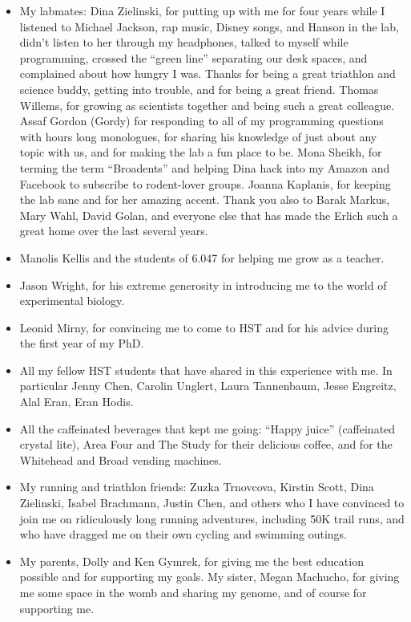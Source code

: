 \begin{itemize}
\item My labmates: Dina Zielinski, for putting up with me for four years while I listened to Michael Jackson, rap music, Disney songs, and Hanson in the lab, didn't listen to her through my headphones, talked to myself while programming, crossed the ``green line'' separating our desk spaces, and complained about how hungry I was. Thanks for being a great triathlon and science buddy, getting into trouble, and for being a great friend. Thomas Willems, for growing as scientists together and being such a great colleague. Assaf Gordon (Gordy) for responding to all of my programming questions with hours long monologues, for sharing his knowledge of just about any topic with us, and for making the lab a fun place to be. Mona Sheikh, for terming the term ``Broadents'' and helping Dina hack into my Amazon and Facebook to subscribe to rodent-lover groups. Joanna Kaplanis, for keeping the lab sane and for her amazing accent. Thank you also to Barak Markus, Mary Wahl, David Golan, and everyone else that has made the Erlich such a great home over the last several years.

\item Manolis Kellis and the students of 6.047 for helping me grow as a teacher.

\item Jason Wright, for his extreme generosity in introducing me to the world of experimental biology.

\item Leonid Mirny, for convincing me to come to HST and for his advice during the first year of my PhD.

\item All my fellow HST students that have shared in this experience with me. In particular Jenny Chen, Carolin Unglert, Laura Tannenbaum, Jesse Engreitz, Alal Eran, Eran Hodis.

\item All the caffeinated beverages that kept me going: ``Happy juice'' (caffeinated crystal lite), Area Four and The Study for their delicious coffee, and for the Whitehead and Broad vending machines. 

\item My running and triathlon friends: Zuzka Trnovcova, Kirstin Scott, Dina Zielinski, Isabel Brachmann, Justin Chen, and others who I have convinced to join me on ridiculously long running adventures, including 50K trail runs, and who have dragged me on their own cycling and swimming outings.

\item My parents, Dolly and Ken Gymrek, for giving me the best education possible and for supporting my goals. My sister, Megan Machucho, for giving me some space in the womb and sharing my genome, and of course for supporting me.





\end{itemize}